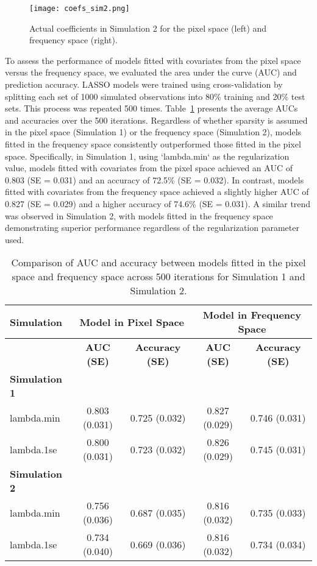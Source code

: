 \documentclass[12pt]{article}
\begin{document}
\begin{figure}[htbp] 
	\centering
	\texttt{[image: coefs\_sim2.png]}
  \caption{Actual coefficients in Simulation 2 for the pixel space (left) and frequency space (right).}
  \label{fig:coefs_sim2}
\end{figure}

To assess the performance of models fitted with covariates from the pixel space versus the frequency space, we evaluated
the area under the curve (AUC) and prediction accuracy. LASSO models were trained using cross-validation by splitting
each set of 1000 simulated observations into 80\% training and 20\% test sets. This process was repeated 500 times.
Table~\ref*{tab:auc_acc_table} presents the average AUCs and accuracies over the 500 iterations. Regardless of whether
sparsity is assumed in the pixel space (Simulation 1) or the frequency space (Simulation 2), models fitted in the
frequency space consistently outperformed those fitted in the pixel space. Specifically, in Simulation 1, using
`lambda.min` as the regularization value,  models fitted with covariates from the pixel space achieved an AUC of
0.803 (SE = 0.031) and an accuracy of 72.5\% (SE = 0.032). In contrast, models fitted with covariates from the 
frequency space achieved a slightly higher AUC of 0.827 (SE = 0.029) and a higher accuracy of
74.6\% (SE = 0.031). A similar trend was observed in Simulation 2, with models fitted in the frequency space
demonstrating superior performance regardless of the regularization parameter used.

\begin{table}[htbp]
\centering
\caption{Comparison of AUC and accuracy between models fitted in the pixel space and frequency space across 500 iterations for Simulation 1 and Simulation 2.}
\label{tab:auc_acc_table}
\begin{tabular}{l|cc|cc}
\toprule
\textbf{Simulation} & \multicolumn{2}{c}{\textbf{Model in Pixel Space}} & \multicolumn{2}{c}{\textbf{Model in Frequency Space}} \\ 
\midrule
& \textbf{AUC (SE)} & \textbf{Accuracy (SE)} & \textbf{AUC (SE)} & \textbf{Accuracy (SE)} \\ 
\midrule
\textbf{Simulation 1} & & & & \\
lambda.min & 0.803 (0.031) & 0.725 (0.032) & 0.827 (0.029) & 0.746 (0.031) \\
lambda.1se & 0.800 (0.031) & 0.723 (0.032) & 0.826 (0.029) & 0.745 (0.031) \\ 
\midrule
\textbf{Simulation 2} & & & & \\
lambda.min & 0.756 (0.036) & 0.687 (0.035) & 0.816 (0.032) & 0.735 (0.033)  \\
lambda.1se & 0.734 (0.040) & 0.669 (0.036) & 0.816 (0.032) & 0.734 (0.034) \\
\bottomrule
\end{tabular}
\end{table}
\end{document}
